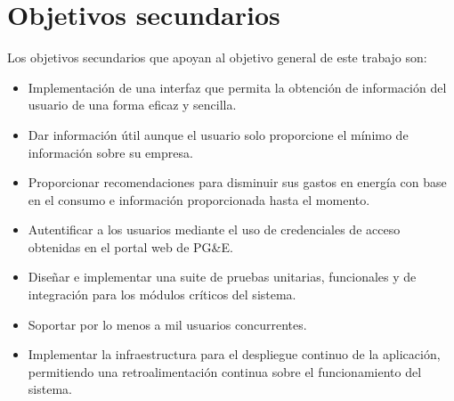 \section*{Objetivos secundarios}

Los objetivos secundarios que apoyan al objetivo general de este trabajo son:
\begin{itemize}
\item Implementación de una interfaz que permita la obtención
  de información del usuario de una forma eficaz y sencilla.
\item Dar información útil aunque el usuario solo proporcione el
  mínimo de información sobre su empresa.
\item Proporcionar recomendaciones para disminuir sus
  gastos en energía con base en el consumo e información proporcionada
  hasta el momento.
\item Autentificar a los usuarios mediante el uso de credenciales de acceso
  obtenidas en el portal web de PG\&E.
\item Diseñar e implementar una suite de pruebas unitarias, funcionales
  y de integración para los módulos críticos del sistema.
\item Soportar por lo menos a mil usuarios concurrentes.
\item Implementar la infraestructura para el despliegue continuo de la
  aplicación, permitiendo una retroalimentación continua sobre el
  funcionamiento del sistema.
\end{itemize}
